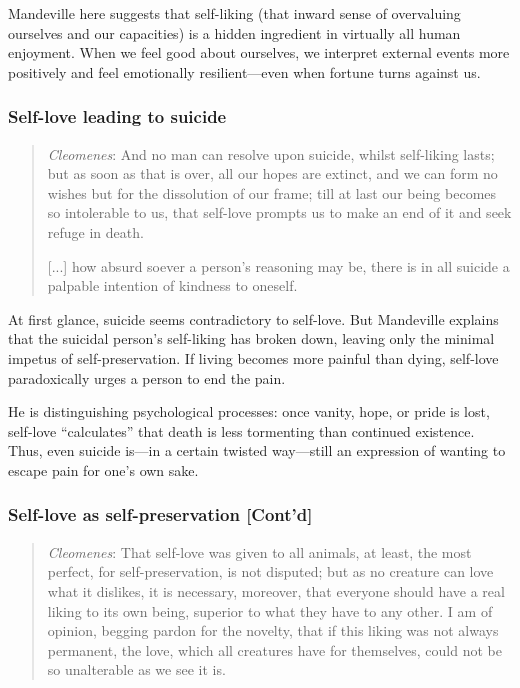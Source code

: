             Mandeville here suggests that self-liking (that inward sense of overvaluing ourselves and our capacities) is a hidden ingredient in virtually all human enjoyment. When we feel good about ourselves, we interpret external events more positively and feel emotionally resilient—even when fortune turns against us.

        \subsubsection{Self-love leading to suicide}

            \begin{quote}
                \textit{Cleomenes}: And no man can resolve upon suicide, whilst self-liking lasts; but as soon as that is over, all our hopes are extinct, and we can form no wishes but for the dissolution of our frame; till at last our being becomes so intolerable to us, that self-love prompts us to make an end of it and seek refuge in death.
                
                [...] how absurd soever a person’s reasoning may be, there is in all suicide a palpable intention of kindness to oneself.
            \end{quote}

            At first glance, suicide seems contradictory to self-love. But Mandeville explains that the suicidal person’s self-liking has broken down, leaving only the minimal impetus of self-preservation. If living becomes more painful than dying, self-love paradoxically urges a person to end the pain.
            
            He is distinguishing psychological processes: once vanity, hope, or pride is lost, self-love “calculates” that death is less tormenting than continued existence. Thus, even suicide is—in a certain twisted way—still an expression of wanting to escape pain for one’s own sake.
        \subsubsection{Self-love as self-preservation [Cont'd]}

            \begin{quote}
                \textit{Cleomenes}: That self-love was given to all animals, at least, the most perfect, for self-preservation, is not disputed; but as no creature can love what it dislikes, it is necessary, moreover, that everyone should have a real liking to its own being, superior to what they have to any other. I am of opinion, begging pardon for the novelty, that if this liking was not always permanent, the love, which all creatures have for themselves, could not be so unalterable as we see it is.    
            \end{quote}

